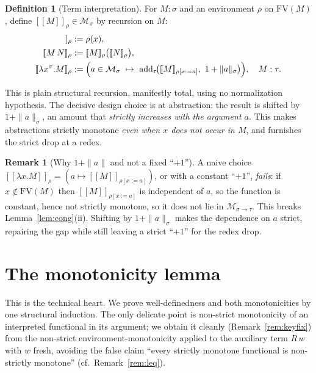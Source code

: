 \documentclass{amsart}
\theoremstyle{definition}
\newtheorem{definition}{Definition}
\newtheorem{remark}{Remark}
\newcommand{\interp}[1]{[\![#1]\!]}
\newcommand{\FV}{\mathrm{FV}}
\begin{document}
\begin{definition}[Term interpretation]\label{def:interp}
For $M:\sigma$ and an environment $\rho$ on $\FV(M)$, define $\interp{M}_\rho\in\mathcal M_\sigma$
by recursion on $M$:
\begin{align*}
  \interp{x}_\rho &:= \rho(x),\\
  \interp{M\,N}_\rho &:= \interp{M}_\rho\bigl(\interp{N}_\rho\bigr),\\
  \interp{\lambda x^\sigma.M}_\rho &:=
     \Bigl(a\in\mathcal M_\sigma\ \mapsto\
       \mathrm{add}_\tau\!\bigl(\interp{M}_{\rho[x:=a]},\ 1+\|a\|_\sigma\bigr)\Bigr),
     \quad M:\tau .
\end{align*}
\end{definition}

This is plain structural recursion, manifestly total, using no normalization hypothesis.
The decisive design choice is at abstraction: the result is shifted by $1+\|a\|_\sigma$, an
amount that \emph{strictly increases with the argument $a$}. This makes abstractions
strictly monotone \emph{even when $x$ does not occur in $M$}, and furnishes the strict drop
at a redex.

\begin{remark}[Why $1+\|a\|$ and not a fixed ``$+1$'']\label{rem:why}
A naive choice $\interp{\lambda x.M}_\rho=(a\mapsto\interp{M}_{\rho[x:=a]})$, or with a
constant ``$+1$'', \emph{fails}: if $x\notin\FV(M)$ then $\interp{M}_{\rho[x:=a]}$ is
independent of $a$, so the function is constant, hence not strictly monotone, so it does not
lie in $\mathcal M_{\sigma\to\tau}$. This breaks Lemma~\ref{lem:cong}(ii). Shifting by
$1+\|a\|_\sigma$ makes the dependence on $a$ strict, repairing the gap while still leaving a
strict ``$+1$'' for the redex drop.
\end{remark}

\section{The monotonicity lemma}

This is the technical heart. We prove well-definedness and both monotonicities by one
structural induction. The only delicate point is non-strict monotonicity of an interpreted
functional in its argument; we obtain it cleanly (Remark~\ref{rem:keyfix}) from the
non-strict environment-monotonicity applied to the auxiliary term $R\,w$ with $w$ fresh,
avoiding the false claim ``every strictly monotone functional is non-strictly monotone''
(cf.\ Remark~\ref{rem:leq}).
\end{document}
